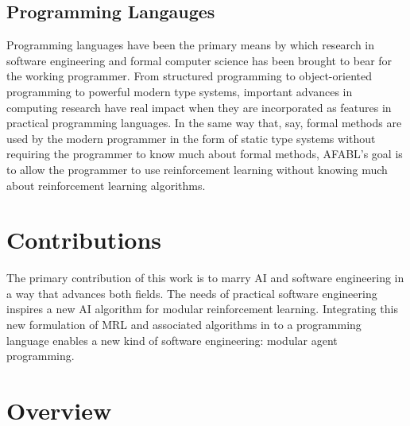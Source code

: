 \subsection{Programming Langauges}

Programming languages have been the primary means by which research in software engineering and formal computer science has been brought to bear for the working programmer. From structured programming to object-oriented programming to powerful modern type systems, important advances in computing research have real impact when they are incorporated as features in practical programming languages. In the same way that, say, formal methods are used by the modern programmer in the form of static type systems without requiring the programmer to know much about formal methods, AFABL's goal is to allow the programmer to use reinforcement learning without knowing much about reinforcement learning algorithms.

\section{Contributions}

The primary contribution of this work is to marry AI and software engineering in a way that advances both fields. The needs of practical software engineering inspires a new AI algorithm for modular reinforcement learning. Integrating this new formulation of MRL and associated algorithms in to a programming language enables a new kind of software engineering: modular agent programming.


\section{Overview}
